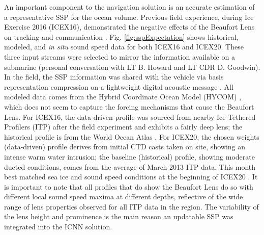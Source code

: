 \documentclass[preprint,TurnOnLineNumbers]{JASA}
\newcommand{\llabel}[1]{\hypertarget{llineno:#1}{\linelabel{#1}}}
\begin{document}
An important component to the navigation solution is an accurate estimation of a representative SSP for the ocean volume.
Previous field experience, during Ice Exercise 2016 (ICEX16), demonstrated the negative effects of the Beaufort Lens on tracking and communication \citep{schmidt_acoustic_2016}.
Fig. \ref{fig:sspExpectation} shows historical, modeled, and \textit{in situ} sound speed data for both ICEX16 and ICEX20.
These three input streams were selected to mirror the information available on a submarine (personal conversation with LT B. Howard and LT CDR D. Goodwin). \llabel{1.8}
In the field, the SSP information was shared with the vehicle via basis representation compression on a lightweight digital acoustic message \citep{bhatt_embedded_2022}. \llabel{2.7}
All modeled data comes from the Hybrid Coordinate Ocean Model (HYCOM) \cite{chassignet_hycom_2007}, which does not seem to capture the forcing mechanisms that cause the Beaufort Lens.
For ICEX16, the data-driven profile was sourced from nearby Ice Tethered Profilers (ITP) after the field experiment \cite{Krishfield2008,toole_ice-tethered_2011} and exhibits a fairly deep lens; the historical profile is from the World Ocean Atlas \cite{woa09}.
For ICEX20, the chosen weights (data-driven) profile derives from initial CTD casts taken on site, showing an intense warm water intrusion; the baseline (historical) profile, showing moderate ducted conditions, comes from the average of March 2013 ITP data.
This month best matched sea ice and sound speed conditions at the beginning of ICEX20 \citep{bhatt_embedded_2022}.
It is important to note that all profiles that do show the Beaufort Lens do so with different local sound speed maxima at different depths, reflective of the wide range of lens properties observed for all ITP data in the region. \llabel{2.5}
The variability of the lens height and prominence is the main reason an updatable SSP was integrated into the ICNN solution.
\end{document}
